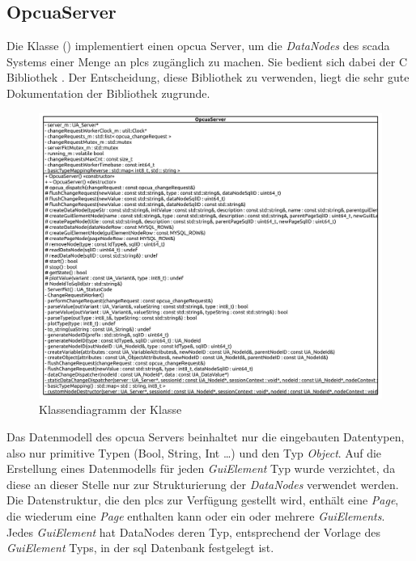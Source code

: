 \subsection{OpcuaServer}
Die Klasse  () implementiert einen \ac{opcua} Server, um die \emph{DataNodes} des \ac{scada} Systems einer Menge an \acp{plc} zugänglich zu machen.
Sie bedient sich dabei der C Bibliothek  \citep{open62541:lib}.
Der Entscheidung, diese Bibliothek zu verwenden, liegt die sehr gute Dokumentation der Bibliothek zugrunde.
\begin{figure}[ht]
  \centering
  \includegraphics[width=\textwidth]{content/hauptteil/umsetzungPoC/backend/uml/classesOfOverview/OpcuaServer.pdf}
  \caption{Klassendiagramm der Klasse }
  \label{fig:backend:classDiag:OpcuaServer}
\end{figure}
Das Datenmodell des \ac{opcua} Servers beinhaltet nur die eingebauten Datentypen, also nur primitive Typen (Bool, String, Int \dots) und den Typ \emph{Object}.
Auf die Erstellung eines Datenmodells für jeden \emph{GuiElement} Typ wurde verzichtet, da diese an dieser Stelle nur zur Strukturierung der \emph{DataNodes} verwendet werden.
Die Datenstruktur, die den \acp{plc} zur Verfügung gestellt wird, enthält eine \emph{Page}, die wiederum eine \emph{Page} enthalten kann oder ein oder mehrere \emph{GuiElements}.
Jedes \emph{GuiElement} hat DataNodes deren Typ, entsprechend der Vorlage des \emph{GuiElement} Typs, in der \ac{sql} Datenbank festgelegt ist.
